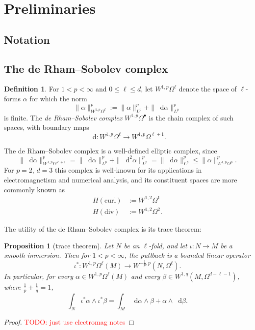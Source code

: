 \documentclass[reqno,11pt]{amsart}
\newcommand*\dif{\mathop{}\!\mathrm{d}}
\newcommand{\dfn}[1]{\emph{#1}\index{#1}}
\newtheorem{proposition}[theorem]{Proposition}
\theoremstyle{definition}
\newtheorem{definition}[theorem]{Definition}
\numberwithin{equation}{section}
\newcommand\todo[1]{\textcolor{red}{TODO: #1}}
\begin{document}
\section{Preliminaries}
\subsection{Notation}
\subsection{The de Rham--Sobolev complex}
\begin{definition}
For $1 < p < \infty$ and $0 \leq \ell \leq d$, let $W^{1, p}\Omega^\ell$ denote the space of $\ell$-forms $\alpha$ for which the norm
$$\|\alpha\|_{W^{1, p} \Omega^\ell}^p := \|\alpha\|_{L^p}^p + \|\dif \alpha\|_{L^p}^p$$
is finite.
The \dfn{de Rham--Sobolev complex} $W^{1, p} \Omega^\bullet$ is the chain complex of such spaces, with boundary maps 
$$\dif: W^{1, p} \Omega^\ell \to W^{1, p} \Omega^{\ell + 1}.$$
\end{definition}

The de Rham--Sobolev complex is a well-defined elliptic complex, since 
$$\|\dif \alpha\|_{W^{1, p} \Omega^{\ell + 1}}^p = \|\dif \alpha\|_{L^p}^p + \|\dif^2 \alpha\|_{L^p}^p = \|\dif \alpha\|_{L^p}^p \leq \|\alpha\|_{W^{1, p} \Omega^p}^p.$$
For $p = 2$, $d = 3$ this complex is well-known for its applications in electromagnetism and numerical analysis, and its constituent spaces are more commonly known as \cite[Chapter 2]{cessenat1996mathematical}
\begin{align*}
H(\text{curl}) &:= W^{1, 2} \Omega^1 \\
H(\text{div}) &:= W^{1, 2} \Omega^2.
\end{align*}

The utility of the de Rham--Sobolev complex is its trace theorem:

\begin{proposition}[trace theorem]
Let $N$ be an $\ell$-fold, and let $\iota: N \to M$ be a smooth immersion.
Then for $1 < p < \infty$, the pullback is a bounded linear operator 
$$\iota^*: W^{1, p} \Omega^\ell(M) \to W^{-\frac{1}{p}, p}(N, \Omega^\ell).$$
In particular, for every $\alpha \in W^{1, p} \Omega^\ell(M)$ and every $\beta \in W^{1, q}(M, \Omega^{d - \ell - 1})$, where $\frac{1}{p} + \frac{1}{q} = 1$,
$$\int_N \iota^* \alpha \wedge \iota^* \beta = \int_M \dif \alpha \wedge \beta + \alpha \wedge \dif \beta.$$
\end{proposition}
\begin{proof}
\todo{just use electromag notes}
\end{proof}
\end{document}
